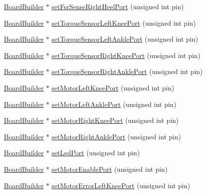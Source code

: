 \begin{DoxyCompactItemize}
\item 
\hyperlink{classBoardBuilder}{Board\+Builder} $\ast$ \hyperlink{classBoardBuilder_adc60f920ae4c6ab0a04a04ffcdfab841}{set\+Fsr\+Sense\+Right\+Heel\+Port} (unsigned int pin)
\item 
\hyperlink{classBoardBuilder}{Board\+Builder} $\ast$ \hyperlink{classBoardBuilder_aee5a03042014d24b747608113ee43923}{set\+Torque\+Sensor\+Left\+Knee\+Port} (unsigned int pin)
\item 
\hyperlink{classBoardBuilder}{Board\+Builder} $\ast$ \hyperlink{classBoardBuilder_a3953a24027d8ae110bfb2c6e67aebb35}{set\+Torque\+Sensor\+Left\+Ankle\+Port} (unsigned int pin)
\item 
\hyperlink{classBoardBuilder}{Board\+Builder} $\ast$ \hyperlink{classBoardBuilder_ae3a14ea9b4d28eefc3b805cce3cce146}{set\+Torque\+Sensor\+Right\+Knee\+Port} (unsigned int pin)
\item 
\hyperlink{classBoardBuilder}{Board\+Builder} $\ast$ \hyperlink{classBoardBuilder_a4cf0f65395b369ab36ab053a20d7f473}{set\+Torque\+Sensor\+Right\+Ankle\+Port} (unsigned int pin)
\item 
\hyperlink{classBoardBuilder}{Board\+Builder} $\ast$ \hyperlink{classBoardBuilder_a8cab4d007a037a8d602d6a988a9d430c}{set\+Motor\+Left\+Knee\+Port} (unsigned int pin)
\item 
\hyperlink{classBoardBuilder}{Board\+Builder} $\ast$ \hyperlink{classBoardBuilder_ab49cb3feff642c9bed2d25e19d037c85}{set\+Motor\+Left\+Ankle\+Port} (unsigned int pin)
\item 
\hyperlink{classBoardBuilder}{Board\+Builder} $\ast$ \hyperlink{classBoardBuilder_a22a77a2e9fa77a26c54a4eb4860c56d0}{set\+Motor\+Right\+Knee\+Port} (unsigned int pin)
\item 
\hyperlink{classBoardBuilder}{Board\+Builder} $\ast$ \hyperlink{classBoardBuilder_afbad400e0c1191cc2577864f108993f7}{set\+Motor\+Right\+Ankle\+Port} (unsigned int pin)
\item 
\hyperlink{classBoardBuilder}{Board\+Builder} $\ast$ \hyperlink{classBoardBuilder_a483759d1e6bb98dbe0958cdcf9ac4d8f}{set\+Led\+Port} (unsigned int pin)
\item 
\hyperlink{classBoardBuilder}{Board\+Builder} $\ast$ \hyperlink{classBoardBuilder_ace373dbca1a62a417afe450f63acbe09}{set\+Motor\+Enable\+Port} (unsigned int pin)
\item 
\hyperlink{classBoardBuilder}{Board\+Builder} $\ast$ \hyperlink{classBoardBuilder_a9e78eb0ccaf73f81653c2e9c3e05c934}{set\+Motor\+Error\+Left\+Knee\+Port} (unsigned int pin)
\item 

\end{DoxyCompactItemize}
